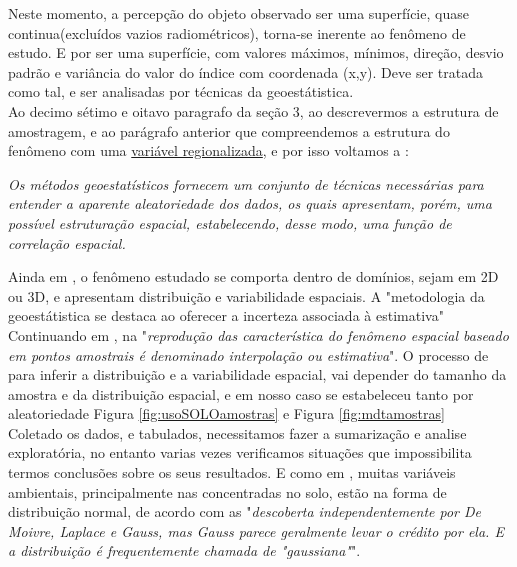   \hspace*{1.25 cm}  Neste momento, a percepção do objeto observado ser uma superfície, quase continua(excluídos vazios radiométricos), torna-se inerente ao fenômeno de estudo. E por ser uma superfície, com valores máximos, mínimos, direção, desvio padrão e variância do valor do índice com coordenada (x,y). Deve ser tratada como tal, e ser analisadas  por técnicas da geoestátistica.   \\
  \hspace*{1.25 cm}  Ao decimo sétimo e oitavo paragrafo da seção 3, ao descrevermos a estrutura de amostragem, e ao parágrafo anterior  que  compreendemos a estrutura do fenômeno com uma \underline{variável regionalizada}, e por isso voltamos a  \cite[p.10]{Yamamoto} :
\begin{quoting}[rightmargin=0cm,leftmargin=4cm]
	\begin{singlespace}
		{
			\textit{Os métodos geoestatísticos fornecem um conjunto de técnicas necessárias para entender a aparente aleatoriedade dos dados, os quais apresentam, porém, uma possível estruturação espacial, estabelecendo, desse modo, uma função de correlação espacial.}
		}
	\end{singlespace}
\end{quoting} 
 \hspace*{1.25 cm} Ainda em  \cite[p.19 e 20]{Yamamoto}, o fenômeno estudado se comporta dentro de domínios, sejam em 2D ou 3D, e apresentam distribuição e variabilidade espaciais. A "metodologia da geoestátistica se destaca ao oferecer a incerteza associada à estimativa" \\
  \hspace*{1.25 cm} Continuando em  \cite[p.20 e 21]{Yamamoto}, na "\textit{reprodução das característica do fenômeno espacial baseado em pontos amostrais é denominado interpolação ou estimativa}". O processo de para inferir a distribuição e a variabilidade espacial, vai  depender do tamanho da amostra e da distribuição espacial, e em nosso caso se estabeleceu tanto por aleatoriedade Figura \ref{fig:usoSOLOamostras} e Figura \ref{fig:mdtamostras} \\
  \hspace*{1.25 cm}  Coletado os dados, e tabulados, necessitamos fazer a sumarização e analise exploratória,  no entanto varias vezes verificamos  situações que impossibilita termos conclusões sobre os seus resultados. E como em  \cite[p.18]{Webster}, muitas variáveis ambientais, principalmente nas  concentradas no solo, estão na forma de distribuição normal, de acordo com as "\textit{descoberta independentemente por De Moivre, Laplace e Gauss, mas Gauss parece geralmente levar o crédito por ela. E a distribuição é frequentemente chamada de "gaussiana"}". \\
